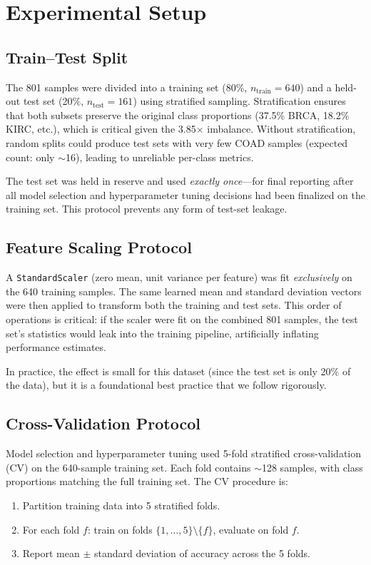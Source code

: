 \documentclass{article}
\begin{document}
\section{Experimental Setup}

\subsection{Train--Test Split}
The 801 samples were divided into a training set (80\%, $n_{\text{train}} = 640$) and a held-out test set (20\%, $n_{\text{test}} = 161$) using stratified sampling. Stratification ensures that both subsets preserve the original class proportions (37.5\% BRCA, 18.2\% KIRC, etc.), which is critical given the 3.85$\times$ imbalance. Without stratification, random splits could produce test sets with very few COAD samples (expected count: only $\sim$16), leading to unreliable per-class metrics.

The test set was held in reserve and used \textit{exactly once}---for final reporting after all model selection and hyperparameter tuning decisions had been finalized on the training set. This protocol prevents any form of test-set leakage.

\subsection{Feature Scaling Protocol}
A \texttt{StandardScaler} (zero mean, unit variance per feature) was fit \textit{exclusively} on the 640 training samples. The same learned mean and standard deviation vectors were then applied to transform both the training and test sets. This order of operations is critical: if the scaler were fit on the combined 801 samples, the test set's statistics would leak into the training pipeline, artificially inflating performance estimates.

In practice, the effect is small for this dataset (since the test set is only 20\% of the data), but it is a foundational best practice that we follow rigorously.

\subsection{Cross-Validation Protocol}
Model selection and hyperparameter tuning used 5-fold stratified cross-validation (CV) on the 640-sample training set. Each fold contains $\sim$128 samples, with class proportions matching the full training set. The CV procedure is:
\begin{enumerate}[leftmargin=2em]
\item Partition training data into 5 stratified folds.
\item For each fold $f$: train on folds $\{1,\ldots,5\} \setminus \{f\}$, evaluate on fold $f$.
\item Report mean $\pm$ standard deviation of accuracy across the 5 folds.
\end{enumerate}
\end{document}
